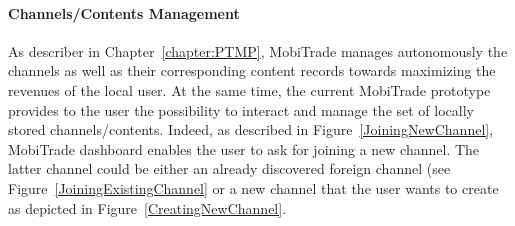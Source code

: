 \paragraph{Channels/Contents Management}

As describer in Chapter~\ref{chapter:PTMP}, MobiTrade manages autonomously the channels as well as their corresponding content records towards maximizing the revenues of the local user. At the same time, the current MobiTrade prototype provides to the user the possibility to interact and manage the set of locally stored channels/contents. Indeed, as described in Figure~\ref{JoiningNewChannel}, MobiTrade dashboard enables the user to ask for joining a new channel. The latter channel could be either an already discovered foreign channel (see Figure~\ref{JoiningExistingChannel} or a new channel that the user wants to create as depicted in Figure~\ref{CreatingNewChannel}.

